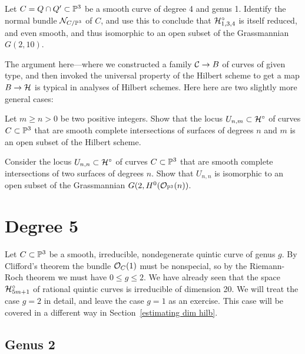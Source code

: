 \begin{exercise}\label{hilb 1,3,4}
Let $C = Q \cap Q' \subset \PP^3$ be a smooth curve of degree 4 and genus 1. Identify the normal bundle $\cN_{C/\PP^3}$ of $C$, and use this to conclude that $\cH^\circ_{1,3,4}$ is itself reduced, and even smooth, and thus isomorphic to an open subset of the Grassmannian $G(2,10)$.
\end{exercise}

The  argument  here---where we constructed a family $\cC \to B$ of curves of given type, and then invoked the universal property of the Hilbert scheme to get a map $B \to \cH$ is typical in analyses of Hilbert schemes. Here here are two slightly more general cases:

\begin{exercise}\label{complete intersection open}
Let $m \geq n >0$ be two positive integers. Show that the locus $U_{n,m} \subset \cH^\circ$ of curves $C \subset \PP^3$ that are smooth complete intersections of surfaces of degrees $n$ and $m$ is an open subset of the Hilbert scheme.
\end{exercise}

\begin{exercise}\label{first complete intersection exercise}
Consider  the locus $U_{n,n} \subset \cH^\circ$ of curves $C \subset \PP^3$ that are smooth complete intersections of two surfaces of degrees $n$. Show that $U_{n,n}$ 
is isomorphic to an open subset of the Grassmannian $G(2, H^0(\cO_{\PP^3}(n))$.
\end{exercise}

\section{Degree 5}

Let $C \subset \PP^3$ be a smooth, irreducible, nondegenerate quintic curve of genus $g$. By Clifford's theorem the bundle $\cO_C(1)$ must be nonspecial, so  by the Riemann-Roch theorem we must have $0\leq g \leq 2$. We have already seen that the space $\cH^\circ_{5m+1}$ of rational quintic curves is irreducible of dimension 20. We will treat the case $g=2$ in detail, and leave the case $g=1$ as an exercise. This case will be covered in a different way in Section~\ref{estimating dim hilb}.

\subsection{Genus 2}

